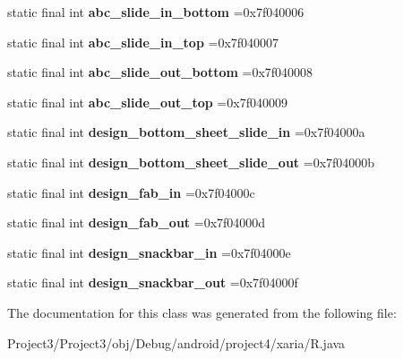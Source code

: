 \begin{DoxyCompactItemize}
static final int {\bfseries abc\+\_\+slide\+\_\+in\+\_\+bottom} =0x7f040006
\item 
\mbox{\label{classproject4_1_1xaria_1_1R_1_1anim_a1b4d68113f09e3fec4ec74e526c9528b}} 
static final int {\bfseries abc\+\_\+slide\+\_\+in\+\_\+top} =0x7f040007
\item 
\mbox{\label{classproject4_1_1xaria_1_1R_1_1anim_ad14bb72102a097f945433c6a452ed283}} 
static final int {\bfseries abc\+\_\+slide\+\_\+out\+\_\+bottom} =0x7f040008
\item 
\mbox{\label{classproject4_1_1xaria_1_1R_1_1anim_aa7e43279e6759a9f47b496500fd29b33}} 
static final int {\bfseries abc\+\_\+slide\+\_\+out\+\_\+top} =0x7f040009
\item 
\mbox{\label{classproject4_1_1xaria_1_1R_1_1anim_aef64a10b0fe29bdd309f01452e05f095}} 
static final int {\bfseries design\+\_\+bottom\+\_\+sheet\+\_\+slide\+\_\+in} =0x7f04000a
\item 
\mbox{\label{classproject4_1_1xaria_1_1R_1_1anim_af97bc003027a436f5ec64a747ea7f0e1}} 
static final int {\bfseries design\+\_\+bottom\+\_\+sheet\+\_\+slide\+\_\+out} =0x7f04000b
\item 
\mbox{\label{classproject4_1_1xaria_1_1R_1_1anim_a0d4ef68dc3eb6d09d272a604ac49fd23}} 
static final int {\bfseries design\+\_\+fab\+\_\+in} =0x7f04000c
\item 
\mbox{\label{classproject4_1_1xaria_1_1R_1_1anim_a045908527247932a8051b57ed38d9ab4}} 
static final int {\bfseries design\+\_\+fab\+\_\+out} =0x7f04000d
\item 
\mbox{\label{classproject4_1_1xaria_1_1R_1_1anim_a2b6a99258366388900d786b13773b160}} 
static final int {\bfseries design\+\_\+snackbar\+\_\+in} =0x7f04000e
\item 
\mbox{\label{classproject4_1_1xaria_1_1R_1_1anim_ae2c5abe1927db606f057a557f51a5550}} 
static final int {\bfseries design\+\_\+snackbar\+\_\+out} =0x7f04000f
\end{DoxyCompactItemize}


The documentation for this class was generated from the following file\+:\begin{DoxyCompactItemize}
\item 
Project3/\+Project3/obj/\+Debug/android/project4/xaria/R.\+java\end{DoxyCompactItemize}

